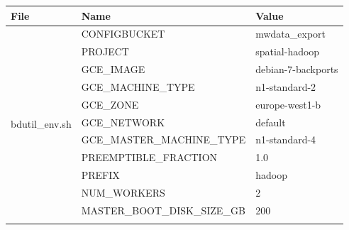 \documentclass[a4paper,12pt,oneside]{report}
\begin{document}
\begin{table}[!htbp]
\centering
\begin{scriptsize}
\begin{tabular}{@{}lll@{}}
\toprule
\multicolumn{1}{|l|}{File}                        & \multicolumn{1}{l|}{Name}                         & \multicolumn{1}{l|}{Value}              \\ \midrule \midrule
\multicolumn{1}{|l|}{\multirow{17}{*}{bdutil\_env.sh}} & \multicolumn{1}{l|}{CONFIGBUCKET}                 & \multicolumn{1}{l|}{mwdata\_export}     \\ \cmidrule(l){2-3} 
\multicolumn{1}{|l|}{}                                 & \multicolumn{1}{l|}{PROJECT}                      & \multicolumn{1}{l|}{spatial-hadoop}     \\ \cmidrule(l){2-3} 
\multicolumn{1}{|l|}{}                                 & \multicolumn{1}{l|}{GCE\_IMAGE}                   & \multicolumn{1}{l|}{debian-7-backports} \\ \cmidrule(l){2-3} 
\multicolumn{1}{|l|}{}                                 & \multicolumn{1}{l|}{GCE\_MACHINE\_TYPE}           & \multicolumn{1}{l|}{n1-standard-2}      \\ \cmidrule(l){2-3} 
\multicolumn{1}{|l|}{}                                 & \multicolumn{1}{l|}{GCE\_ZONE}                    & \multicolumn{1}{l|}{europe-west1-b}     \\ \cmidrule(l){2-3} 
\multicolumn{1}{|l|}{}                                 & \multicolumn{1}{l|}{GCE\_NETWORK}                 & \multicolumn{1}{l|}{default}            \\ \cmidrule(l){2-3} 
\multicolumn{1}{|l|}{}                                 & \multicolumn{1}{l|}{GCE\_MASTER\_MACHINE\_TYPE}   & \multicolumn{1}{l|}{n1-standard-4}      \\ \cmidrule(l){2-3} 
\multicolumn{1}{|l|}{}                                 & \multicolumn{1}{l|}{PREEMPTIBLE\_FRACTION}        & \multicolumn{1}{l|}{1.0}                \\ \cmidrule(l){2-3} 
\multicolumn{1}{|l|}{}                                 & \multicolumn{1}{l|}{PREFIX}                       & \multicolumn{1}{l|}{hadoop}             \\ \cmidrule(l){2-3} 
\multicolumn{1}{|l|}{}                                 & \multicolumn{1}{l|}{NUM\_WORKERS}                 & \multicolumn{1}{l|}{2}                  \\ \cmidrule(l){2-3} 
\multicolumn{1}{|l|}{}                                 & \multicolumn{1}{l|}{MASTER\_BOOT\_DISK\_SIZE\_GB} & \multicolumn{1}{l|}{200}                \\ \cmidrule(l){2-3} 

\end{tabular}
\end{scriptsize}
\end{table}
\end{document}
